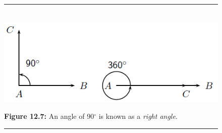     \setcounter{subfigure}{0}
	\begin{figure}[H] %
    \begin{center}
    \rule[.1in]{\figurerulewidth}{.005in} \\
        \label{m39370*uid18!!!underscore!!!media}\label{m39370*uid18!!!underscore!!!printimage}\includegraphics{col11306.imgs/m39370_MG10C13_007.png} %
      \vspace{2pt}
    \vspace{\rubberspace}\par \begin{cnxcaption}
	  \small \textbf{Figure 12.7: }An angle of 90${}^{\circ }$ is known as a \textsl{right angle}.
	\end{cnxcaption}
    \vspace{.1in}
    \rule[.1in]{\figurerulewidth}{.005in} \\
    \end{center}
 \end{figure}       
\label{m39370*secfhsst!!!underscore!!!id210}
